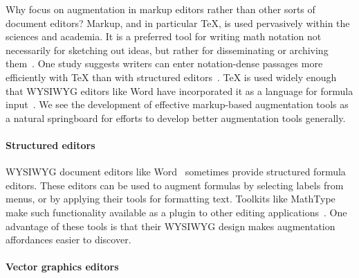 Why focus on augmentation in markup editors rather than other sorts of document editors? Markup, and in particular TeX, is used pervasively within the sciences and academia.
It is a preferred tool for writing math notation not necessarily for sketching out ideas, but rather for disseminating or archiving them~\cite{ref:misfeldt2011computers}.
One study suggests writers can enter notation-dense passages more efficiently with TeX than with structured editors~\cite{ref:knauff2014efficiency}. TeX is used widely enough that WYSIWYG editors like Word have incorporated it as a language for formula input~\cite{ref:matthews2019craft}. We see the development of effective markup-based augmentation tools as a natural springboard for efforts to develop better augmentation tools generally.


\paragraph{Structured editors}

WYSIWYG document editors like Word~\cite{tool:wordformulaeditor} sometimes provide structured formula editors. These editors can be used to augment formulas by selecting labels from menus, or by applying their tools for formatting text. Toolkits like MathType make such functionality available as a plugin to other editing applications~\cite{ref:topping1999using}. One advantage of these tools is that their WYSIWYG design makes augmentation affordances easier to discover.

\paragraph{Vector graphics editors}


